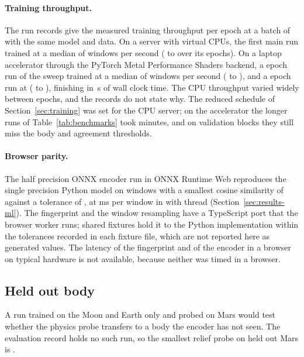 \paragraph{Training throughput.} The run records give the measured training throughput per epoch at
a batch of \TrainBatch{} with the same model and data. On a server with \ThruCpuCount{} virtual
CPUs, the first main run trained at a median of \ThruCpuMedian{} windows per second (\ThruCpuMin{}
to \ThruCpuMax{} over its epochs). On a laptop accelerator through the PyTorch Metal Performance
Shaders backend, a \TrainEpochs{} epoch run of the sweep trained at a median of \ThruMpsTwelveMedian{} windows per
second (\ThruMpsTwelveMin{} to \ThruMpsTwelveMax), and a \ThruMpsFortyEpochs{} epoch run at
\ThruMpsFortyMedian{} (\ThruMpsFortyMin{} to \ThruMpsFortyMax), finishing in
\ThruMpsFortyWallSeconds\,s of wall clock time. The CPU throughput varied widely between epochs,
and the records do not state why. The reduced schedule of Section~\ref{sec:training} was set for the
CPU server; on the accelerator the longer runs of Table~\ref{tab:benchmarks} took minutes, and
on validation blocks they still miss the body and agreement thresholds.

\paragraph{Browser parity.} The half precision ONNX encoder run in ONNX Runtime Web
\WasmOrtVersion{} reproduces the single precision Python model on \WasmWindows{} windows with a
smallest cosine similarity of \WasmMinCosine{} against a tolerance of \WasmThreshold, at
\WasmMs{} ms per window in \WasmRuntime{} with \WasmThreads{} thread
(Section~\ref{sec:results-ml}). The fingerprint and the window resampling have a TypeScript port
that the browser worker runs; shared fixtures hold it to the Python implementation within the
tolerances recorded in each fixture file, which are not reported here as generated values. The
latency of the fingerprint and of the encoder in a browser on typical hardware is not available,
because neither was timed in a browser.

\subsection{Held out body}
\label{sec:results-heldout}

A run trained on the Moon and Earth only and probed on Mars would test whether the physics probe transfers to a body the encoder has not seen. The evaluation record holds no such run, so the smallest relief probe \Rsq{} on held out Mars is \HeldOutMarsR.

